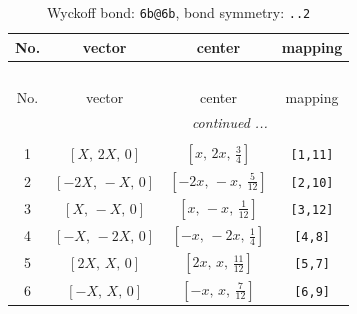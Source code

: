 \documentclass[fleqn,8pt]{jsarticle}
\begin{document}
\begin{longtable}{cccc}
\caption{Wyckoff bond: {\tt 6b@6b}, bond symmetry: {\tt ..2}}
 \\
 \hline \hline
No. & vector & center & mapping \\ \hline \endfirsthead

\multicolumn{3}{l}{\tablename\ \thetable{}} \\
 \hline \hline
No. & vector & center & mapping \\ \hline \endhead

 \hline \hline
\multicolumn{3}{r}{\footnotesize\it continued ...} \\ \endfoot

 \hline \hline
\multicolumn{3}{r}{} \\ \endlastfoot

1 & $\left[ X,\, 2 X,\, 0 \right]$ & $\left[ x,\, 2 x,\, \frac{3}{4} \right]$ & {\tt [1,11]} \\ \hline
2 & $\left[ - 2 X,\, - X,\, 0 \right]$ & $\left[ - 2 x,\, - x,\, \frac{5}{12} \right]$ & {\tt [2,10]} \\ \hline
3 & $\left[ X,\, - X,\, 0 \right]$ & $\left[ x,\, - x,\, \frac{1}{12} \right]$ & {\tt [3,12]} \\ \hline
4 & $\left[ - X,\, - 2 X,\, 0 \right]$ & $\left[ - x,\, - 2 x,\, \frac{1}{4} \right]$ & {\tt [4,8]} \\ \hline
5 & $\left[ 2 X,\, X,\, 0 \right]$ & $\left[ 2 x,\, x,\, \frac{11}{12} \right]$ & {\tt [5,7]} \\ \hline
6 & $\left[ - X,\, X,\, 0 \right]$ & $\left[ - x,\, x,\, \frac{7}{12} \right]$ & {\tt [6,9]} \\
\end{longtable}
\renewcommand{\arraystretch}{1.2}
\end{document}
